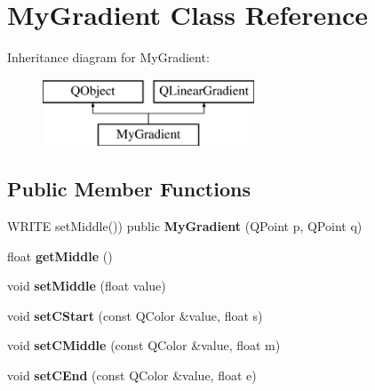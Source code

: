 \hypertarget{class_my_gradient}{\section{My\-Gradient Class Reference}
\label{class_my_gradient}
}
Inheritance diagram for My\-Gradient\-:\begin{figure}[H]
\begin{center}
\leavevmode
\includegraphics[height=2.000000cm]{class_my_gradient}
\end{center}
\end{figure}
\subsection*{Public Member Functions}
\begin{DoxyCompactItemize}
\item 
\hypertarget{class_my_gradient_a27908adf6a6414a655fcdeace0953302}{W\-R\-I\-T\-E set\-Middle()) public {\bfseries My\-Gradient} (Q\-Point p, Q\-Point q)}\label{class_my_gradient_a27908adf6a6414a655fcdeace0953302}

\item 
\hypertarget{class_my_gradient_ae4ff6baad026510ca45d7a9f8ffda66a}{float {\bfseries get\-Middle} ()}\label{class_my_gradient_ae4ff6baad026510ca45d7a9f8ffda66a}

\item 
\hypertarget{class_my_gradient_a1656afe4362af1975765577cfae0cca4}{void {\bfseries set\-Middle} (float value)}\label{class_my_gradient_a1656afe4362af1975765577cfae0cca4}

\item 
\hypertarget{class_my_gradient_a2623282273f1ea70ad7fa7ce2a413f66}{void {\bfseries set\-C\-Start} (const Q\-Color \&value, float s)}\label{class_my_gradient_a2623282273f1ea70ad7fa7ce2a413f66}

\item 
\hypertarget{class_my_gradient_a361ab9506f1206105e256f7c0003beff}{void {\bfseries set\-C\-Middle} (const Q\-Color \&value, float m)}\label{class_my_gradient_a361ab9506f1206105e256f7c0003beff}

\item 
\hypertarget{class_my_gradient_aebcbe44cd5b4bcab9c02d02ddf3557c1}{void {\bfseries set\-C\-End} (const Q\-Color \&value, float e)}\label{class_my_gradient_aebcbe44cd5b4bcab9c02d02ddf3557c1}

\end{DoxyCompactItemize}
